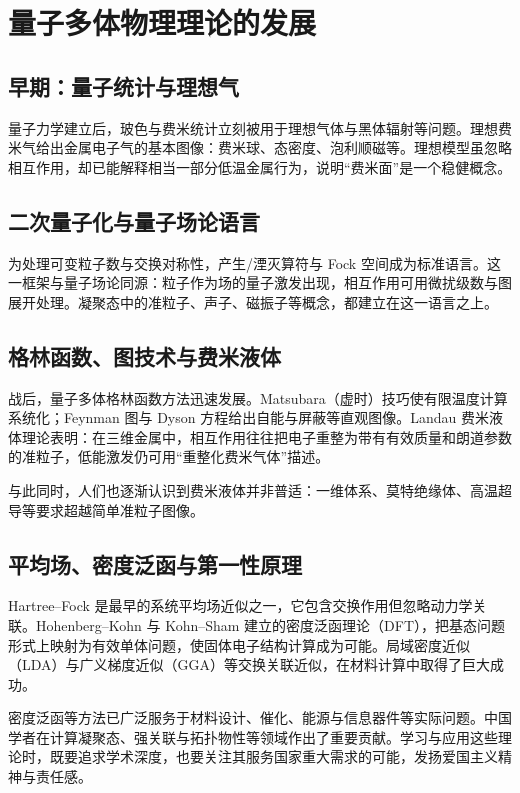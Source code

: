 \section{量子多体物理理论的发展}

\subsection{早期：量子统计与理想气}

量子力学建立后，玻色与费米统计立刻被用于理想气体与黑体辐射等问题。理想费米气给出金属电子气的基本图像：费米球、态密度、泡利顺磁等。理想模型虽忽略相互作用，却已能解释相当一部分低温金属行为，说明“费米面”是一个稳健概念。

\subsection{二次量子化与量子场论语言}

为处理可变粒子数与交换对称性，产生/湮灭算符与 Fock 空间成为标准语言。这一框架与量子场论同源：粒子作为场的量子激发出现，相互作用可用微扰级数与图展开处理。凝聚态中的准粒子、声子、磁振子等概念，都建立在这一语言之上。

\subsection{格林函数、图技术与费米液体}

战后，量子多体格林函数方法迅速发展。Matsubara（虚时）技巧使有限温度计算系统化；Feynman 图与 Dyson 方程给出自能与屏蔽等直观图像。Landau 费米液体理论表明：在三维金属中，相互作用往往把电子重整为带有有效质量和朗道参数的准粒子，低能激发仍可用“重整化费米气体”描述。

与此同时，人们也逐渐认识到费米液体并非普适：一维体系、莫特绝缘体、高温超导等要求超越简单准粒子图像。

\subsection{平均场、密度泛函与第一性原理}

Hartree--Fock 是最早的系统平均场近似之一，它包含交换作用但忽略动力学关联。Hohenberg--Kohn 与 Kohn--Sham 建立的密度泛函理论（DFT），把基态问题形式上映射为有效单体问题，使固体电子结构计算成为可能。局域密度近似（LDA）与广义梯度近似（GGA）等交换关联近似，在材料计算中取得了巨大成功。

\begin{note}
密度泛函等方法已广泛服务于材料设计、催化、能源与信息器件等实际问题。中国学者在计算凝聚态、强关联与拓扑物性等领域作出了重要贡献。学习与应用这些理论时，既要追求学术深度，也要关注其服务国家重大需求的可能，发扬爱国主义精神与责任感。
\end{note}

